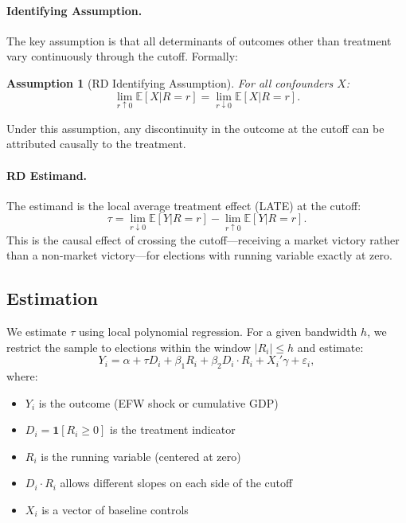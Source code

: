\documentclass[12pt,a4paper]{article}
\newtheorem{assumption}{Assumption}
\newcommand{\E}{\mathbb{E}}
\begin{document}
\paragraph{Identifying Assumption.}
The key assumption is that all determinants of outcomes other than 
treatment vary continuously through the cutoff. Formally:
\begin{assumption}[RD Identifying Assumption]
For all confounders $X$:
\begin{equation}
    \lim_{r \uparrow 0} \E[X | R = r] = \lim_{r \downarrow 0} \E[X | R = r].
\end{equation}
\end{assumption}
Under this assumption, any discontinuity in the outcome at the cutoff 
can be attributed causally to the treatment.

\paragraph{RD Estimand.}
The estimand is the local average treatment effect (LATE) at the cutoff:
\begin{equation}
    \tau = \lim_{r \downarrow 0} \E[Y | R = r] - \lim_{r \uparrow 0} \E[Y | R = r].
    \label{eq:rd_estimand}
\end{equation}
This is the causal effect of crossing the cutoff---receiving a market 
victory rather than a non-market victory---for elections with running 
variable exactly at zero.

\subsection{Estimation}

We estimate $\tau$ using local polynomial regression. For a given 
bandwidth $h$, we restrict the sample to elections within the window 
$|R_i| \leq h$ and estimate:
\begin{equation}
    Y_i = \alpha + \tau D_i + \beta_1 R_i + \beta_2 D_i \cdot R_i + 
    X_i'\gamma + \varepsilon_i,
    \label{eq:rd_estimation}
\end{equation}
where:
\begin{itemize}[noitemsep]
    \item $Y_i$ is the outcome (EFW shock or cumulative GDP)
    \item $D_i = \mathbf{1}[R_i \geq 0]$ is the treatment indicator
    \item $R_i$ is the running variable (centered at zero)
    \item $D_i \cdot R_i$ allows different slopes on each side of the cutoff
    \item $X_i$ is a vector of baseline controls
\end{itemize}
\end{document}
